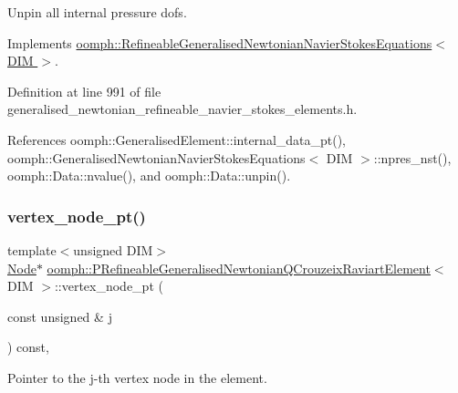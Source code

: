 Unpin all internal pressure dofs. 



Implements \hyperlink{classoomph_1_1RefineableGeneralisedNewtonianNavierStokesEquations_a5e80fae3c3c4373e082867a49cc78ad0}{oomph\+::\+Refineable\+Generalised\+Newtonian\+Navier\+Stokes\+Equations$<$ D\+I\+M $>$}.



Definition at line 991 of file generalised\+\_\+newtonian\+\_\+refineable\+\_\+navier\+\_\+stokes\+\_\+elements.\+h.



References oomph\+::\+Generalised\+Element\+::internal\+\_\+data\+\_\+pt(), oomph\+::\+Generalised\+Newtonian\+Navier\+Stokes\+Equations$<$ D\+I\+M $>$\+::npres\+\_\+nst(), oomph\+::\+Data\+::nvalue(), and oomph\+::\+Data\+::unpin().

\mbox{\label{classoomph_1_1PRefineableGeneralisedNewtonianQCrouzeixRaviartElement_ae2fe7e53f670c3bbe10bfd505ff0e198}} 
\subsubsection{\texorpdfstring{vertex\+\_\+node\+\_\+pt()}{vertex\_node\_pt()}}
{\footnotesize\ttfamily template$<$unsigned D\+IM$>$ \\
\hyperlink{classoomph_1_1Node}{Node}$\ast$ \hyperlink{classoomph_1_1PRefineableGeneralisedNewtonianQCrouzeixRaviartElement}{oomph\+::\+P\+Refineable\+Generalised\+Newtonian\+Q\+Crouzeix\+Raviart\+Element}$<$ D\+IM $>$\+::vertex\+\_\+node\+\_\+pt (\begin{DoxyParamCaption}\item[{const unsigned \&}]{j }\end{DoxyParamCaption}) const\hspace{0.3cm}{\ttfamily [inline]}, {\ttfamily [virtual]}}



Pointer to the j-\/th vertex node in the element. 



